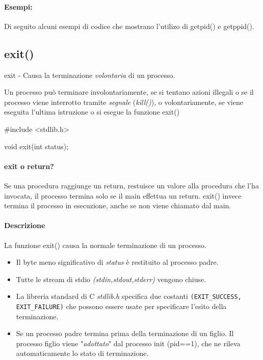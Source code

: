 \documentclass
[10pt,        %
 a4paper,     %
 onecolumn,   %
 fleqn,       %
 oneside,     %
 notitlepage, %
]{article}    %
\begin{document}
\paragraph{Esempi:}
Di seguito alcuni esempi di codice che mostrano l'utilizo di getpid() e getppid().




\subsection{exit()}
exit - Causa la terminazione \textit{volontaria} di un processo.

Un processo può terminare involontariamente, se si tentano azioni illegali o se il processo viene interrotto tramite \textit{segnale} (\textit{kill()}), o volontariamente, se viene eseguita l'ultima istruzione o si esegue la funzione exit()
\begin{C}
#include <stdlib.h>
    
void exit(int status);
\end{C}
    
\paragraph{exit o return?}
Se una procedura raggiunge un return, restuisce un valore alla procedura che l'ha invocata, il processo termina solo se il main effettua un return. exit() invece termina il processo in esecuzione, anche se non viene chiamato dal main.

\paragraph{Descrizione}
La funzione exit() causa la normale terminazione di un processo.
\begin{itemize}
    \item Il byte meno significativo di \textit{status} è restituito al processo padre.
    \item Tutte le stream di stdio \textit{(stdin,stdout,stderr)} vengono chiuse.
    \item La libreria standard di C \textit{stdlib.h} specifica due costanti \lstinline!(EXIT_SUCCESS, EXIT_FAILURE)! che possono essere usate per specificare l'esito della terminazione.
    \item Se un processo padre termina prima della terminazione di un figlio. Il processo figlio viene "\textit{adottato}" dal processo init (pid==1), che ne rileva automaticamente lo stato di terminazione.
\end{itemize}
\end{document}
